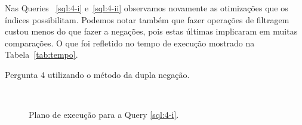 \documentclass[a4paper,12pt]{article}
\begin{document}
Nas Queries ~\ref{sql:4-i} e~\ref{sql:4-ii} observamos novamente as otimizações que
os índices possibilitam. Podemos notar também que fazer operações de filtragem custou
menos do que fazer a negações, pois estas últimas implicaram em muitas comparações.
O que foi refletido no tempo de execução mostrado na Tabela~\ref{tab:tempo}.

\begin{program}
   
   \caption{Pergunta 4 utilizando o método da dupla negação.}
   \label{sql:4-i}
\end{program}

\begin{figure}[hpt]
   \begin{center}
      \\
   \end{center}
   \caption{Plano de execução para a Query \ref{sql:4-i}.}
   \label{fig:plano_4-i}
\end{figure}
\end{document}
